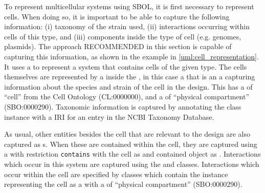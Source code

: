 To represent multicellular systems using SBOL, it is first necessary to represent cells. 
When doing so, it is important to be able to capture the following information: (i) taxonomy of the strain used, (ii) interactions occurring within cells of this type, and (iii) components inside the type of cell (e.g. genomes, plasmids). 
The approach RECOMMENDED in this section is capable of capturing this information, as shown in the example in \ref{uml:cell_representation}. 
It uses a  to represent a system that contains cells of the given type.
The cells themselves are represented by a  inside the , in this case a  that is an  
a  capturing information about the species and strain of the cell in the design. 
This  has a  of ``cell'' from the Cell Ontology (CL:0000000), and a  of ``physical compartment'' (SBO:0000290).
Taxonomic information is captured by annotating the class instance with a IRI for an entry in the NCBI Taxonomy Database. 

As usual, other entities besides the cell that are relevant to the design are also captured as s.
When these are contained within the cell, they are captured using a  with restriction \texttt{contains} with the cell as  and contained object as .
Interactions which occur in this system are captured using the  and  classes. 
Interactions which occur within the cell are specified by  classes which contain the  instance representing the cell as a  with a  of ``physical compartment'' (SBO:0000290).

